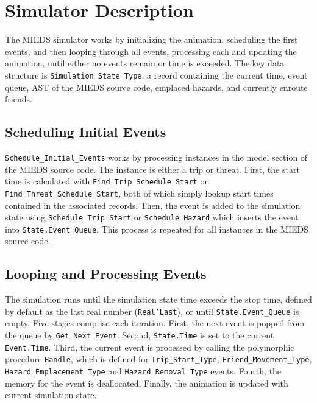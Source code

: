 \documentclass[12pt,letterpaper,titlepage]{article}
\newcommand{\code}[1]{\texttt{#1}}
\newcommand{\mieds}[0]{\textsc{MIEDS}}
\begin{document}

\doublespacing

\section{Simulator Description}

The \mieds{} simulator works by initializing the animation, scheduling
the first events, and then looping through all events, processing each
and updating the animation, until either no events remain or time is
exceeded.  The key data structure is \code{Simulation_State_Type}, a
record containing the current time, event queue, AST of the \mieds{}
source code, emplaced hazards, and currently enroute friends.

\subsection{Scheduling Initial Events}

\code{Schedule_Initial_Events} works by processing instances in the
model section of the \mieds{} source code.  The instance is either a
trip or threat.  First, the start time is calculated with
\code{Find_Trip_Schedule_Start} or \code{Find_Threat_Schedule_Start},
both of which simply lookup start times contained in the associated
records.  Then, the event is added to the simulation state using
\code{Schedule_Trip_Start} or \code{Schedule_Hazard} which inserts the
event into \code{State.Event_Queue}.  This process is repeated for all
instances in the \mieds{} source code.

\subsection{Looping and Processing Events}

The simulation runs until the simulation state time exceeds the stop
time, defined by default as the last real number (\code{Real'Last}),
or until \code{State.Event_Queue} is empty.  Five stages comprise each
iteration.  First, the next event is popped from the queue by
\code{Get_Next_Event}.  Second, \code{State.Time} is set to the
current \code{Event.Time}.  Third, the current event is processed by
calling the polymorphic procedure \code{Handle}, which is defined for
\code{Trip_Start_Type}, \code{Friend_Movement_Type},
\code{Hazard_Emplacement_Type} and \code{Hazard_Removal_Type} events.
Fourth, the memory for the event is deallocated.  Finally, the
animation is updated with current simulation state.
\end{document}
